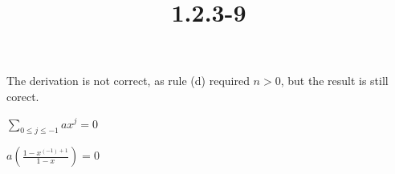 \documentclass{article}
\title{1.2.3-9}
\begin{document}
\maketitle

The derivation is not correct, as rule (d) required $n > 0$, but the result is still corect.

$\sum_{0 \leq j \leq -1} ax^j = 0$

$a(\frac{1-x^{(-1)+1}}{1-x}) = 0$
\end{document}
